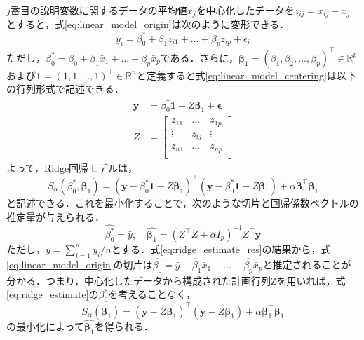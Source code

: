 \documentclass[a4paper,twocolumn]{ujarticle} %
\begin{document}
$j$番目の説明変数に関するデータの平均値$\bar{x}_j$を中心化したデータを$z_{ij}=x_{ij} - \bar{x}_j$とすると，式\eqref{eq:linear_model_origin}は次のように変形できる．
\begin{equation}
        y_i = \beta_0^* + \beta_1 z_{i1} + \dots + \beta_p z_{ip} + \epsilon_i
	\label{eq:linear_model_centering}
\end{equation}
ただし，$\beta_0^* = \beta_0 + \beta_1 \bar{x}_{1} + \dots + \beta_p \bar{x}_{p}$である．さらに，$\bm{\beta}_1 = (\beta_1, \beta_2, \dots , \beta_p)^{\top} \in \mathbb{R}^p$および$ \bm{1} = (1, 1, \dots , 1)^{\top} \in \mathbb{R}^n$と定義すると式\eqref{eq:linear_model_centering}は以下の行列形式で記述できる．
\begin{equation}
	\begin{split}
		\bm{y} &= \beta_0^* \bm{1} + Z \bm{\beta}_1 + \bm{\epsilon}\\
		Z &= \left[
                \begin{array}{ccc}
                z_{11} & \dots & z_{1p} \\
                \vdots & z_{ij} & \vdots \\
                z_{n1} & \dots & z_{np} \\
                \end{array}
                \right]
        \end{split}
	\label{eq:linear_model_mat}
\end{equation}
よって，Ridge回帰モデルは，
\begin{equation}
	S_{\alpha}(\beta_0^* , \bm{\beta}_1) = (\bm{y} - \beta_0^* \bm{1} - Z \bm{\beta}_1)^{\top} (\bm{y} - \beta_0^* \bm{1} - Z \bm{\beta}_1) + \alpha \bm{\beta}_1^{\top} \bm{\beta}_1 
	\label{eq:ridge_estimate}
\end{equation}
と記述できる．これを最小化することで，次のような切片と回帰係数ベクトルの推定量が与えられる．
\begin{equation}
	\hat{\beta_0^*} = \bar{y}, \quad \hat{\bm{\beta}_1} = (Z^{\top}Z + \alpha I_p)^{-1} Z^{\top} \bm{y}
	\label{eq:ridge_estimate_res}
\end{equation}
ただし，$\bar{y}=\sum_{i=1}^{n}{y_i}/n$とする．式\eqref{eq:ridge_estimate_res}の結果から，式\eqref{eq:linear_model_origin}の切片は$\hat{\beta_0} = \bar{y} - \hat{\beta}_1 \bar{x}_1 - \dots - \hat{\beta_p} \bar{x}_p$と推定されることが分かる．つまり，中心化したデータから構成された計画行列Zを用いれば，式\eqref{eq:ridge_estimate}の$\beta_0^*$を考えることなく，
\begin{equation}
	S_{\alpha}(\bm{\beta}_1) = (\bm{y} - Z \bm{\beta}_1)^{\top}  (\bm{y} - Z\bm{\beta}_1) + \alpha \bm{\beta}_1^{\top} \bm{\beta}_1
	\label{eq:ridge_estimate_beta1hat}
\end{equation}
の最小化によって$\hat{\bm{\beta}_1}$を得られる．
\end{document}
